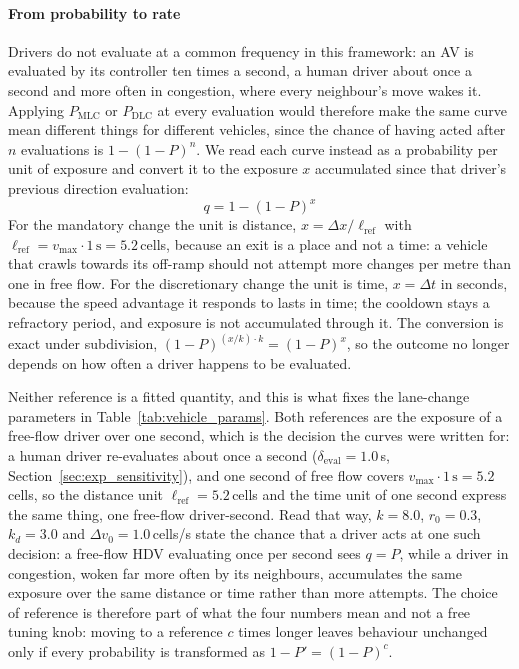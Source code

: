 \documentclass[review,number]{elsarticle}
\begin{document}
\paragraph{From probability to rate}
Drivers do not evaluate at a common frequency in this framework: an AV is evaluated by its controller ten times a second, a human driver about once a second and more often in congestion, where every neighbour's move wakes it. Applying $P_{\text{MLC}}$ or $P_{\text{DLC}}$ at every evaluation would therefore make the same curve mean different things for different vehicles, since the chance of having acted after $n$ evaluations is $1 - (1-P)^n$. We read each curve instead as a probability per unit of exposure and convert it to the exposure $x$ accumulated since that driver's previous direction evaluation:
\begin{equation}
    q = 1 - (1 - P)^{x}
    \label{eq:lc_rate}
\end{equation}
For the mandatory change the unit is distance, $x = \Delta x / \ell_{\text{ref}}$ with $\ell_{\text{ref}} = v_{\max} \cdot 1\,\text{s} = 5.2$\,cells, because an exit is a place and not a time: a vehicle that crawls towards its off-ramp should not attempt more changes per metre than one in free flow. For the discretionary change the unit is time, $x = \Delta t$ in seconds, because the speed advantage it responds to lasts in time; the cooldown stays a refractory period, and exposure is not accumulated through it. The conversion is exact under subdivision, $(1-P)^{(x/k) \cdot k} = (1-P)^x$, so the outcome no longer depends on how often a driver happens to be evaluated.

Neither reference is a fitted quantity, and this is what fixes the lane-change parameters in Table~\ref{tab:vehicle_params}. Both references are the exposure of a free-flow driver over one second, which is the decision the curves were written for: a human driver re-evaluates about once a second ($\delta_{\text{eval}} = 1.0$\,s, Section~\ref{sec:exp_sensitivity}), and one second of free flow covers $v_{\max} \cdot 1\,\text{s} = 5.2$\,cells, so the distance unit $\ell_{\text{ref}} = 5.2$\,cells and the time unit of one second express the same thing, one free-flow driver-second. Read that way, $k = 8.0$, $r_0 = 0.3$, $k_d = 3.0$ and $\Delta v_0 = 1.0$\,cells/s state the chance that a driver acts at one such decision: a free-flow HDV evaluating once per second sees $q = P$, while a driver in congestion, woken far more often by its neighbours, accumulates the same exposure over the same distance or time rather than more attempts. The choice of reference is therefore part of what the four numbers mean and not a free tuning knob: moving to a reference $c$ times longer leaves behaviour unchanged only if every probability is transformed as $1 - P' = (1 - P)^{c}$.
\end{document}
